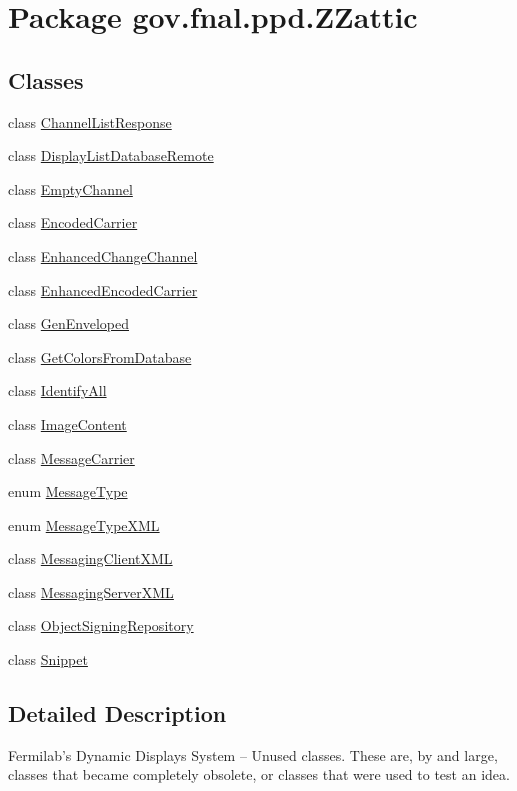 \hypertarget{namespacegov_1_1fnal_1_1ppd_1_1ZZattic}{\section{Package gov.\-fnal.\-ppd.\-Z\-Zattic}
\label{namespacegov_1_1fnal_1_1ppd_1_1ZZattic}
}
\subsection*{Classes}
\begin{DoxyCompactItemize}
\item 
class \hyperlink{classgov_1_1fnal_1_1ppd_1_1ZZattic_1_1ChannelListResponse}{Channel\-List\-Response}
\item 
class \hyperlink{classgov_1_1fnal_1_1ppd_1_1ZZattic_1_1DisplayListDatabaseRemote}{Display\-List\-Database\-Remote}
\item 
class \hyperlink{classgov_1_1fnal_1_1ppd_1_1ZZattic_1_1EmptyChannel}{Empty\-Channel}
\item 
class \hyperlink{classgov_1_1fnal_1_1ppd_1_1ZZattic_1_1EncodedCarrier}{Encoded\-Carrier}
\item 
class \hyperlink{classgov_1_1fnal_1_1ppd_1_1ZZattic_1_1EnhancedChangeChannel}{Enhanced\-Change\-Channel}
\item 
class \hyperlink{classgov_1_1fnal_1_1ppd_1_1ZZattic_1_1EnhancedEncodedCarrier}{Enhanced\-Encoded\-Carrier}
\item 
class \hyperlink{classgov_1_1fnal_1_1ppd_1_1ZZattic_1_1GenEnveloped}{Gen\-Enveloped}
\item 
class \hyperlink{classgov_1_1fnal_1_1ppd_1_1ZZattic_1_1GetColorsFromDatabase}{Get\-Colors\-From\-Database}
\item 
class \hyperlink{classgov_1_1fnal_1_1ppd_1_1ZZattic_1_1IdentifyAll}{Identify\-All}
\item 
class \hyperlink{classgov_1_1fnal_1_1ppd_1_1ZZattic_1_1ImageContent}{Image\-Content}
\item 
class \hyperlink{classgov_1_1fnal_1_1ppd_1_1ZZattic_1_1MessageCarrier}{Message\-Carrier}
\item 
enum \hyperlink{enumgov_1_1fnal_1_1ppd_1_1ZZattic_1_1MessageType}{Message\-Type}
\item 
enum \hyperlink{enumgov_1_1fnal_1_1ppd_1_1ZZattic_1_1MessageTypeXML}{Message\-Type\-X\-M\-L}
\item 
class \hyperlink{classgov_1_1fnal_1_1ppd_1_1ZZattic_1_1MessagingClientXML}{Messaging\-Client\-X\-M\-L}
\item 
class \hyperlink{classgov_1_1fnal_1_1ppd_1_1ZZattic_1_1MessagingServerXML}{Messaging\-Server\-X\-M\-L}
\item 
class \hyperlink{classgov_1_1fnal_1_1ppd_1_1ZZattic_1_1ObjectSigningRepository}{Object\-Signing\-Repository}
\item 
class \hyperlink{classgov_1_1fnal_1_1ppd_1_1ZZattic_1_1Snippet}{Snippet}
\end{DoxyCompactItemize}


\subsection{Detailed Description}
Fermilab's Dynamic Displays System -- Unused classes. These are, by and large, classes that became completely obsolete, or classes that were used to test an idea. 
